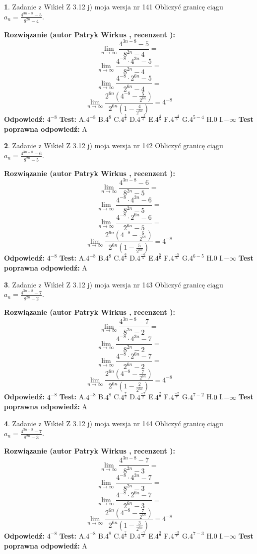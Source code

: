 \documentclass[12pt, a4paper]{article}
\theoremstyle{definition} %
\newtheorem{zad}{}
\newcommand{\zadStart}[1]{\begin{zad}#1\newline}
\newcommand{\zadStop}{\end{zad}}
\newcommand{\rozwStart}[2]{\noindent \textbf{Rozwiązanie (autor #1 , recenzent #2): }\newline}
\newcommand{\rozwStop}{\newline}
\newcommand{\odpStart}{\noindent \textbf{Odpowiedź:}\newline}
\newcommand{\odpStop}{\newline}
\newcommand{\testStart}{\noindent \textbf{Test:}\newline}
\newcommand{\testStop}{\newline}
\newcommand{\kluczStart}{\noindent \textbf{Test poprawna odpowiedź:}\newline}
\newcommand{\kluczStop}{\newline}
\begin{document}
\zadStart{Zadanie z Wikieł Z 3.12 j) moja wersja nr 141}
Obliczyć granicę ciągu $a_{n}=\frac{4^{3n-8}-5}{8^{2n}-4}$.
\zadStop
\rozwStart{Patryk Wirkus}{}
$$\lim\limits_{n\to\infty}\frac{4^{3n-8}-5}{8^{2n}-4}=$$
$$\lim\limits_{n\to\infty}\frac{4^{-8} \cdot 4^{3n}-5}{8^{2n}-4}=$$
$$\lim\limits_{n\to\infty}\frac{4^{-8} \cdot 2^{6n}-5}{2^{6n}-4}=$$
$$\lim\limits_{n\to\infty}\frac{2^{6n}(4^{-8} - \frac{5}{2^{6n}})}{2^{6n}(1-\frac{4}{2^{6n}})}= 4^{-8}$$
\rozwStop
\odpStart
$4^{-8}$
\odpStop
\testStart
A.$4^{-8}$
B.$4^{8}$
C.$4^{\frac{5}{4}}$
D.$4^{\frac{-5}{4}}$
E.$4^{\frac{4}{5}}$
F.$4^{\frac{-4}{5}}$
G.$4^{5-4}$
H.$0$
I.$-\infty$
\testStop
\kluczStart
A
\kluczStop



\zadStart{Zadanie z Wikieł Z 3.12 j) moja wersja nr 142}
Obliczyć granicę ciągu $a_{n}=\frac{4^{3n-8}-6}{8^{2n}-5}$.
\zadStop
\rozwStart{Patryk Wirkus}{}
$$\lim\limits_{n\to\infty}\frac{4^{3n-8}-6}{8^{2n}-5}=$$
$$\lim\limits_{n\to\infty}\frac{4^{-8} \cdot 4^{3n}-6}{8^{2n}-5}=$$
$$\lim\limits_{n\to\infty}\frac{4^{-8} \cdot 2^{6n}-6}{2^{6n}-5}=$$
$$\lim\limits_{n\to\infty}\frac{2^{6n}(4^{-8} - \frac{6}{2^{6n}})}{2^{6n}(1-\frac{5}{2^{6n}})}= 4^{-8}$$
\rozwStop
\odpStart
$4^{-8}$
\odpStop
\testStart
A.$4^{-8}$
B.$4^{8}$
C.$4^{\frac{6}{5}}$
D.$4^{\frac{-6}{5}}$
E.$4^{\frac{5}{6}}$
F.$4^{\frac{-5}{6}}$
G.$4^{6-5}$
H.$0$
I.$-\infty$
\testStop
\kluczStart
A
\kluczStop



\zadStart{Zadanie z Wikieł Z 3.12 j) moja wersja nr 143}
Obliczyć granicę ciągu $a_{n}=\frac{4^{3n-8}-7}{8^{2n}-2}$.
\zadStop
\rozwStart{Patryk Wirkus}{}
$$\lim\limits_{n\to\infty}\frac{4^{3n-8}-7}{8^{2n}-2}=$$
$$\lim\limits_{n\to\infty}\frac{4^{-8} \cdot 4^{3n}-7}{8^{2n}-2}=$$
$$\lim\limits_{n\to\infty}\frac{4^{-8} \cdot 2^{6n}-7}{2^{6n}-2}=$$
$$\lim\limits_{n\to\infty}\frac{2^{6n}(4^{-8} - \frac{7}{2^{6n}})}{2^{6n}(1-\frac{2}{2^{6n}})}= 4^{-8}$$
\rozwStop
\odpStart
$4^{-8}$
\odpStop
\testStart
A.$4^{-8}$
B.$4^{8}$
C.$4^{\frac{7}{2}}$
D.$4^{\frac{-7}{2}}$
E.$4^{\frac{2}{7}}$
F.$4^{\frac{-2}{7}}$
G.$4^{7-2}$
H.$0$
I.$-\infty$
\testStop
\kluczStart
A
\kluczStop



\zadStart{Zadanie z Wikieł Z 3.12 j) moja wersja nr 144}
Obliczyć granicę ciągu $a_{n}=\frac{4^{3n-8}-7}{8^{2n}-3}$.
\zadStop
\rozwStart{Patryk Wirkus}{}
$$\lim\limits_{n\to\infty}\frac{4^{3n-8}-7}{8^{2n}-3}=$$
$$\lim\limits_{n\to\infty}\frac{4^{-8} \cdot 4^{3n}-7}{8^{2n}-3}=$$
$$\lim\limits_{n\to\infty}\frac{4^{-8} \cdot 2^{6n}-7}{2^{6n}-3}=$$
$$\lim\limits_{n\to\infty}\frac{2^{6n}(4^{-8} - \frac{7}{2^{6n}})}{2^{6n}(1-\frac{3}{2^{6n}})}= 4^{-8}$$
\rozwStop
\odpStart
$4^{-8}$
\odpStop
\testStart
A.$4^{-8}$
B.$4^{8}$
C.$4^{\frac{7}{3}}$
D.$4^{\frac{-7}{3}}$
E.$4^{\frac{3}{7}}$
F.$4^{\frac{-3}{7}}$
G.$4^{7-3}$
H.$0$
I.$-\infty$
\testStop
\kluczStart
A
\kluczStop
\end{document}
